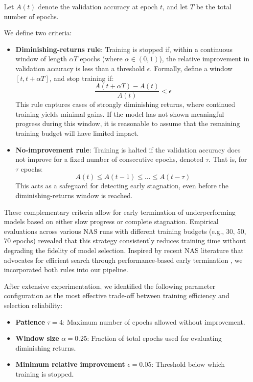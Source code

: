 Let \( A(t) \) denote the validation accuracy at epoch \( t \), and let \( T \) be the total number of epochs.

We define two criteria:
\begin{itemize}


 \item \textbf{Diminishing-returns rule}: Training is stopped if, within a continuous window of length \( \alpha T \) epochs (where \( \alpha \in (0,1) \)), the relative improvement in validation accuracy is less than a threshold \( \epsilon \). Formally, define a window \( [t, t+\alpha T] \), and stop training if:
  \[
  \frac{A(t+\alpha T) - A(t)}{A(t)} < \epsilon
  \]
  This rule captures cases of strongly diminishing returns, where continued training yields minimal gains. If the model has not shown meaningful progress during this window, it is reasonable to assume that the remaining training budget will have limited impact.

   \item \textbf{No-improvement rule}: Training is halted if the validation accuracy does not improve for a fixed number of consecutive epochs, denoted \( \tau \). That is, for \( \tau \) epochs:
  \[
  A(t) \leq A(t-1) \leq \dots \leq A(t-\tau)
  \]
  This acts as a safeguard for detecting early stagnation, even before the diminishing-returns window is reached.

\end{itemize}


These complementary criteria allow for early termination of underperforming models based on either slow progress or complete stagnation. Empirical evaluations across various NAS runs with different training budgets (e.g., 30, 50, 70 epochs) revealed that this strategy consistently reduces training time without degrading the fidelity of model selection. Inspired by recent NAS literature that advocates for efficient search through performance-based early termination \cite{li2020random}, we incorporated both rules into our pipeline.

After extensive experimentation, we identified the following parameter configuration as the most effective trade-off between training efficiency and selection reliability:

\begin{itemize}
  \item \textbf{Patience} \( \tau = 4 \): Maximum number of epochs allowed without improvement.
  \item \textbf{Window size} \( \alpha = 0.25 \): Fraction of total epochs used for evaluating diminishing returns.
  \item \textbf{Minimum relative improvement} \( \epsilon = 0.05 \): Threshold below which training is stopped.
\end{itemize}

